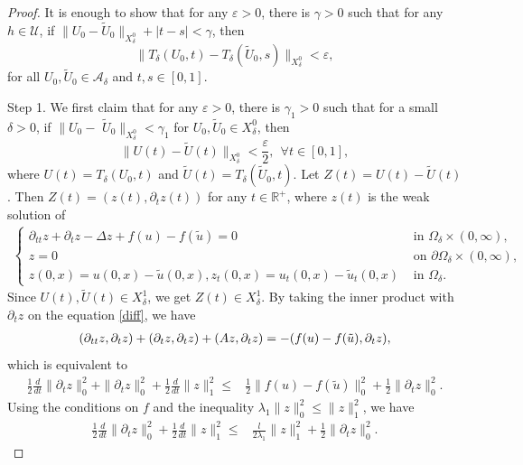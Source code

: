 \documentclass[11pt]{amsart}
\begin{document}
\begin{proof} 
It is enough to show that for any $\varepsilon >0$, there is $\gamma >0$ such that  for any ${h\in \mathcal{U}}$, if $\|U_0 - \tilde{U}_0\|_{X^0_{\delta}} + |t-s| < \gamma$, then
    $$\| T_{\delta}(U_0, t) - T_{\delta}(\tilde{U}_0, s) \|_{X^0_{\delta}} < \varepsilon,$$
 for all $U_0, \tilde{U}_0 \in \mathcal{A}_\delta$   and  $t, s\in [0,1]$.

Step 1.
We first claim that for any $\varepsilon>0$, there is $\gamma_{1}>0$ such that for a small $\delta>0$,  if  $\| U_{0}-$ $\tilde{U}_{0} \|_{X^0_{\delta}}<\gamma_{1}$ for $U_0, \tilde{U}_0 \in X_\delta^0$, then
\begin{equation*}
\|U(t)-\tilde{U}(t)\|_{X^0_{\delta}}<\frac{\varepsilon}{2}, ~~\forall t \in[0,1],
\end{equation*}
where $U(t)=T_{{\delta}}\left(U_{0}, t\right)$ and $\tilde{U}(t)=T_{{\delta}}(\tilde{U}_{0}, t)$. Let $Z(t)=U(t)-\tilde{U}(t)$. Then $Z(t) = (z(t), \partial_t z(t))$ for any  $t \in \mathbb{R}^{+}$, where $z(t)$ is the weak solution of 
\begin{align} \label{diff}
\begin{cases}\partial_{tt} z +\partial_t z-\Delta z+f(u)-f(\tilde{u})=0 & \text { in } \Omega_{{\delta}} \times(0, \infty), \\ z=0 & \text { on } \partial \Omega_{{\delta}} \times(0, \infty), \\ 
z(0,x) = u(0,x)-\tilde{u}(0,x), z_t(0,x) = u_t(0,x)-\tilde{u}_t(0,x)& \text { in } \Omega_{{\delta}}.\end{cases}
\end{align}
Since $U(t), \tilde{U}(t) \in X^1_{\delta}$, we get  $Z(t)\in X^1_{\delta}$. By taking the inner product with $\partial_t z$ on the equation \eqref{diff}, we have
\begin{align}
    (\partial_{tt}z, \partial_t z) + (\partial_{t}z, \partial_t z) +(Az, \partial_t z) = -(f(u)-f(\tilde{u}), \partial_t z),\notag
\end{align}
which is equivalent to
\begin{align*}    
    \frac{1}{2} \frac{d}{dt}\|\partial_t z\|^2_0 + \|\partial_t z\|^2_0+ \frac{1}{2}\frac{d}{dt}\| z\|^2_1\leq &\frac{1}{2}\|f(u)-f(\tilde{u})\|^2_0+\frac{1}{2}\|\partial_t z\|^2_0.
\end{align*}
Using the conditions on $f$ and the inequality $\lambda_1 \|z\|^2_0 \leq \|z\|^2_1$, we have
\begin{align*}
    \frac{1}{2} \frac{d}{dt}\|\partial_t z\|^2_0 + \frac{1}{2}\frac{d}{dt}\| z\|^2_1 \leq &\frac{l}{2\lambda_1}\|z\|^2_1+\frac{1}{2}\|\partial_t z\|^2_0.

\end{align*}
\end{proof}
\end{document}
